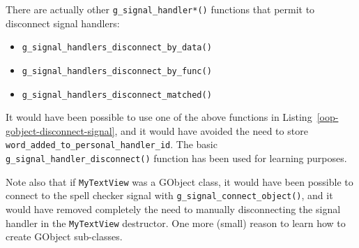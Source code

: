 There are actually other \lstinline{g_signal_handler*()} functions that permit to disconnect signal handlers:
\begin{itemize}
  \item \lstinline{g_signal_handlers_disconnect_by_data()}
  \item \lstinline{g_signal_handlers_disconnect_by_func()}
  \item \lstinline{g_signal_handlers_disconnect_matched()}
\end{itemize}

It would have been possible to use one of the above functions in Listing~\ref{oop-gobject-disconnect-signal}, and it would have avoided the need to store \lstinline{word_added_to_personal_handler_id}. The basic \lstinline{g_signal_handler_disconnect()} function has been used for learning purposes.

Note also that if \lstinline{MyTextView} was a GObject class, it would have been possible to connect to the spell checker signal with \lstinline{g_signal_connect_object()}, and it would have removed completely the need to manually disconnecting the signal handler in the \lstinline{MyTextView} destructor. One more (small) reason to learn how to create GObject sub-classes.


